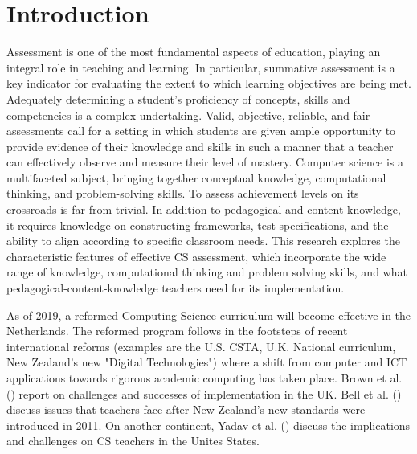 \section{Introduction}\label{sec:intro}
Assessment is one of the most fundamental aspects of education, playing an integral role in teaching and learning. In particular, summative assessment is a key indicator for evaluating the extent to which learning objectives are being met. Adequately determining a student's proficiency of concepts, skills and competencies is a complex undertaking. Valid, objective, reliable, and fair assessments call for a setting in which students are given ample opportunity to provide evidence of their knowledge and skills in such a manner that a teacher can effectively observe and measure their level of mastery. Computer science is a multifaceted subject, bringing together conceptual knowledge, computational thinking, and problem-solving skills. To assess achievement levels on its crossroads is far from trivial. In addition to pedagogical and content knowledge, it requires knowledge on constructing frameworks, test specifications, and the ability to align according to specific classroom needs. This research explores the characteristic features of effective CS assessment, which incorporate the wide range of knowledge, computational thinking and problem solving skills, and what pedagogical-content-knowledge teachers need for its implementation. 



As of 2019, a reformed Computing Science curriculum will become effective in the Netherlands. The reformed program follows in the footsteps of recent international reforms (examples are the U.S. CSTA, U.K. National curriculum, New Zealand's new "Digital Technologies") where a shift from computer and ICT applications towards rigorous academic computing has taken place. Brown et al. (\cite{Brown2013}) report on challenges and successes of implementation in the UK. Bell et al. (\cite{Bell2014}) discuss issues that teachers face after New Zealand's new standards were introduced in 2011. On another continent, Yadav et al. (\cite{Yadav2016}) discuss the implications and challenges on CS teachers in the Unites States.

